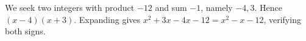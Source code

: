 We seek two integers with product $-12$ and sum $-1$, namely $-4,3$. Hence $\boxed{(x-4)(x+3)}$. Expanding gives $x^2+3x-4x-12=x^2-x-12$, verifying both signs.
